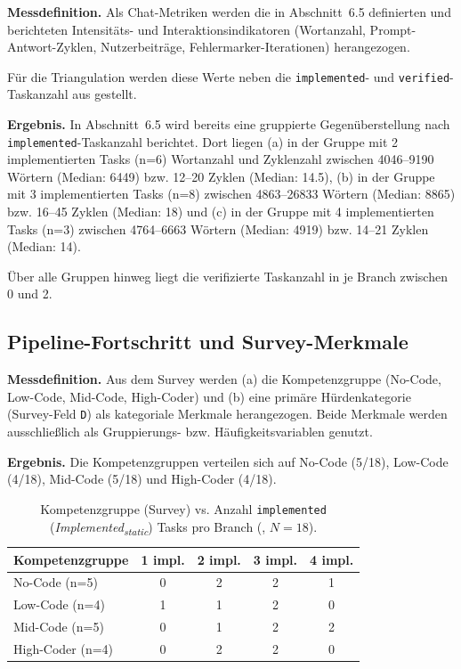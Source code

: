 {\bfseries Messdefinition.} Als Chat-Metriken werden die in Abschnitt~6.5 definierten und berichteten Intensitäts- und Interaktionsindikatoren (Wortanzahl, Prompt-Antwort-Zyklen, Nutzerbeiträge, Fehlermarker-Iterationen) herangezogen.
\begin{sloppypar}
Für die Triangulation werden diese Werte neben die \texttt{implemented}- und \texttt{verified}-Taskanzahl aus  gestellt.
\end{sloppypar}

{\bfseries Ergebnis.} In Abschnitt~6.5 wird bereits eine gruppierte Gegenüberstellung nach \texttt{implemented}-Taskanzahl berichtet.
Dort liegen (a) in der Gruppe mit 2 implementierten Tasks (n=6) Wortanzahl und Zyklenzahl zwischen 4046--9190 Wörtern (Median: 6449) bzw. 12--20 Zyklen (Median: 14.5), (b) in der Gruppe mit 3 implementierten Tasks (n=8) zwischen 4863--26833 Wörtern (Median: 8865) bzw. 16--45 Zyklen (Median: 18) und (c) in der Gruppe mit 4 implementierten Tasks (n=3) zwischen 4764--6663 Wörtern (Median: 4919) bzw. 14--21 Zyklen (Median: 14).
\begin{sloppypar}
Über alle Gruppen hinweg liegt die verifizierte Taskanzahl in  je Branch zwischen 0 und 2.
\end{sloppypar}

\subsection{Pipeline-Fortschritt und Survey-Merkmale}
\label{sec:results_triangulation_survey}

{\bfseries Messdefinition.} Aus dem Survey werden (a) die Kompetenzgruppe (No-Code, Low-Code, Mid-Code, High-Coder) und (b) eine primäre Hürdenkategorie (Survey-Feld \texttt{D}) als kategoriale Merkmale herangezogen.
Beide Merkmale werden ausschließlich als Gruppierungs- bzw. Häufigkeitsvariablen genutzt.

{\bfseries Ergebnis.} Die Kompetenzgruppen verteilen sich auf No-Code (5/18), Low-Code (4/18), Mid-Code (5/18) und High-Coder (4/18).

\begin{table}[ht]
\centering
\begin{tabular}{|l|c|c|c|c|}
\hline
{\bfseries Kompetenzgruppe} &  \textbf{1 impl.} &  \textbf{2 impl.} &  \textbf{3 impl.} &  \textbf{4 impl.} \\
\hline
No-Code (n=5) & 0 & 2 & 2 & 1 \\
Low-Code (n=4) & 1 & 1 & 2 & 0 \\
Mid-Code (n=5) & 0 & 1 & 2 & 2 \\
High-Coder (n=4) & 0 & 2 & 2 & 0 \\
\hline
\end{tabular}
\caption{Kompetenzgruppe (Survey) vs. Anzahl \texttt{implemented} (\textit{Implemented\textsubscript{static}}) Tasks pro Branch (\texttt{}, $N=18$).}
\label{tab:triangulation_competence_vs_impl}
\end{table}

